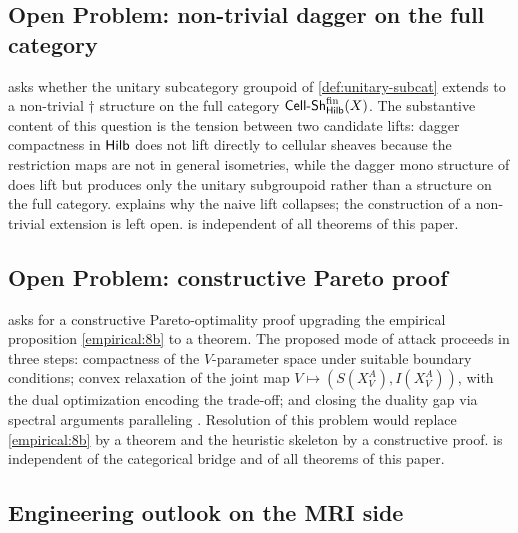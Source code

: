 \subsection{Open Problem: non-trivial dagger on the full category}\label{subsec:disc-op-dagger}

 asks whether the unitary subcategory
groupoid of \cref{def:unitary-subcat} extends to a non-trivial
$\dagger$ structure on the full category $\mathsf{Cell\text{-}Sh}^{\mathrm{fin}}_{\mathsf{Hilb}}(X)$.
The substantive content of this question is the tension between two
candidate lifts: dagger compactness in $\mathsf{Hilb}$
\cite[\S 2.3]{HeunenVicary2019} does not lift directly to cellular
sheaves because the restriction maps are not in general isometries,
while the dagger mono structure of
\cite[\S 3]{LahtinenStenvall2020} does lift but produces only the
unitary subgroupoid rather than a structure on the full category.
 explains why the naive lift collapses; the
construction of a non-trivial extension is left open.
 is independent of all theorems of this
paper.

\subsection{Open Problem: constructive Pareto proof}\label{subsec:disc-op-pareto}

 asks for a constructive Pareto-optimality proof
upgrading the empirical proposition \cref{empirical:8b} to a
theorem. The proposed mode of attack proceeds in three steps:
compactness of the $V$-parameter space under suitable boundary
conditions; convex relaxation of the joint map
$V \mapsto (S(X^A_V), I(X^A_V))$, with the dual optimization
encoding the trade-off; and closing the duality gap via spectral
arguments paralleling \cite{Pilleboue2015}. Resolution of this
problem would replace \cref{empirical:8b} by a theorem and the
heuristic skeleton by a constructive proof.  is
independent of the categorical bridge and of all theorems of this
paper.

\subsection{Engineering outlook on the MRI side}\label{subsec:disc-mri-outlook}

